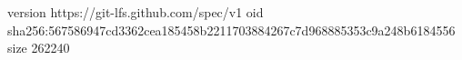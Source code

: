 version https://git-lfs.github.com/spec/v1
oid sha256:567586947cd3362cea185458b2211703884267c7d968885353c9a248b6184556
size 262240
